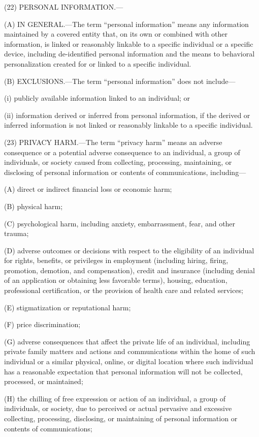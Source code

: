 (22) PERSONAL INFORMATION.—

(A) IN GENERAL.—The term “personal information” means any information maintained by a covered entity that, on its own or combined with other information, is linked or reasonably linkable to a specific individual or a specific device, including de-identified personal information and the means to behavioral personalization created for or linked to a specific individual.

(B) EXCLUSIONS.—The term “personal information” does not include—

(i) publicly available information linked to an individual; or

(ii) information derived or inferred from personal information, if the derived or inferred information is not linked or reasonably linkable to a specific individual.

(23) PRIVACY HARM.—The term “privacy harm” means an adverse consequence or a potential adverse consequence to an individual, a group of individuals, or society caused from collecting, processing, maintaining, or disclosing of personal information or contents of communications, including—

(A) direct or indirect financial loss or economic harm;

(B) physical harm;

(C) psychological harm, including anxiety, embarrassment, fear, and other trauma;

(D) adverse outcomes or decisions with respect to the eligibility of an individual for rights, benefits, or privileges in employment (including hiring, firing, promotion, demotion, and compensation), credit and insurance (including denial of an application or obtaining less favorable terms), housing, education, professional certification, or the provision of health care and related services;

(E) stigmatization or reputational harm;

(F) price discrimination;

(G) adverse consequences that affect the private life of an individual, including private family matters and actions and communications within the home of such individual or a similar physical, online, or digital location where such individual has a reasonable expectation that personal information will not be collected, processed, or maintained;

(H) the chilling of free expression or action of an individual, a group of individuals, or society, due to perceived or actual pervasive and excessive collecting, processing, disclosing, or maintaining of personal information or contents of communications;

